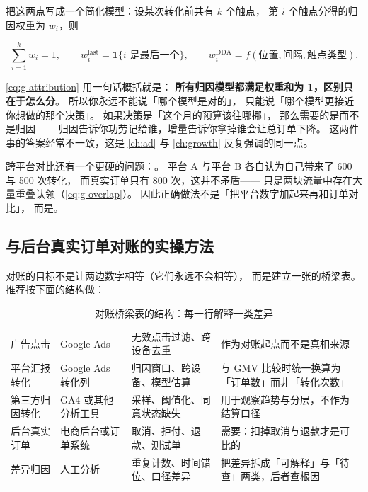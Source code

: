 把这两点写成一个简化模型：设某次转化前共有 $k$ 个触点，
第 $i$ 个触点分得的归因权重为 $w_i$，则

\begin{equation}
\sum_{i=1}^{k} w_i = 1 , \qquad
w_i^{\text{last}} = \mathbf{1}\{\text{$i$ 是最后一个}\} ,
\qquad
w_i^{\text{DDA}} = f(\text{位置}, \text{间隔}, \text{触点类型}) .
\label{eq:g-attribution}
\end{equation}

\cref{eq:g-attribution} 用一句话概括就是：
\textbf{所有归因模型都满足权重和为 1，区别只在于怎么分}。
所以你永远不能说「哪个模型是对的」，
只能说「哪个模型更接近你想做的那个决策」。
如果决策是「这个月的预算该往哪挪」，
那么需要的是而不是归因——
归因告诉你功劳记给谁，增量告诉你拿掉谁会让总订单下降。
这两件事的答案经常不一致，这是 \cref{ch:ad} 与 \cref{ch:growth} 反复强调的同一点。

跨平台对比还有一个更硬的问题：。
平台 A 与平台 B 各自认为自己带来了 600 与 500 次转化，
而真实订单只有 800 次，这并不矛盾——
只是两块流量中存在大量重叠认领（\cref{eq:g-overlap}）。
因此正确做法不是「把平台数字加起来再和订单对比」，
而是。

\subsection{与后台真实订单对账的实操方法}

对账的目标不是让两边数字相等（它们永远不会相等），
而是建立一张的桥梁表。
推荐按下面的结构做：

\begin{table}[htbp]
\centering
\caption{对账桥梁表的结构：每一行解释一类差异}
\label{tab:g-reconcile}
\small
\begin{tabularx}{\textwidth}{L{3.0cm} L{2.6cm} L{3.4cm} Y}
\toprule
{} &  &  &  \\
\midrule
广告点击 & Google Ads & 无效点击过滤、跨设备去重 & 作为对账起点而不是真相来源 \\
\addlinespace
平台汇报转化 & Google Ads 转化列 & 归因窗口、跨设备、模型估算 & 与 GMV 比较时统一换算为「订单数」而非「转化次数」 \\
\addlinespace
第三方归因转化 & GA4 或其他分析工具 & 采样、阈值化、同意状态缺失 & 用于观察趋势与分层，不作为结算口径 \\
\addlinespace
后台真实订单 & 电商后台或订单系统 & 取消、拒付、退款、测试单 & 需要：扣掉取消与退款才是可比的 \\
\addlinespace
差异归因 & 人工分析 & 重复计数、时间错位、口径差异 & 把差异拆成「可解释」与「待查」两类，后者查根因 \\
\bottomrule
\end{tabularx}
\end{table}

